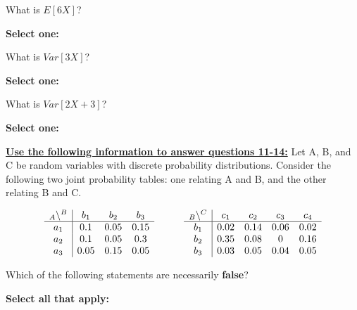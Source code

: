 \documentclass[11pt,addpoints,answers]{exam}
\numberwithin{equation}{section} %
\numberwithin{figure}{section} %
\numberwithin{table}{section} %
\begin{document}
\begin{questions}
    \question[1] What is $E[6X]$?

    \textbf{Select one:}
    \begin{checkboxes}
    \end{checkboxes}


    \question[1] What is $Var[3X]$?

    \textbf{Select one:}
    \begin{checkboxes}
    \end{checkboxes}


    \question[1] What is $Var[2X + 3]$?

    \textbf{Select one:}
    \begin{checkboxes}
    \end{checkboxes}

    \clearpage
    \textbf{\underline{Use the following information to answer questions 11-14:}}
    Let A, B, and C be random variables with discrete probability distributions. Consider the following two joint probability tables: one relating A and B, and the other relating B and C.
    
    $$\begin{array}{c|ccc}
    _{\large A}\backslash^{\large B} & b_1 & b_2 & b_3 \\
    \hline
    a_1 & 0.1 & 0.05 & 0.15 \\
    a_2 & 0.1 & 0.05 & 0.3 \\
    a_3 & 0.05 & 0.15 & 0.05 \\
    \end{array}
    \quad \quad \quad
    \begin{array}{c|cccc}
    _{\large B}\backslash^{\large C} & c_1 & c_2 & c_3 & c_4 \\
    \hline
    b_1 & 0.02 & 0.14 & 0.06 & 0.02 \\
    b_2 & 0.35 & 0.08 & 0 & 0.16 \\
    b_3 & 0.03 & 0.05 & 0.04 & 0.05 \\
    \end{array}$$

    \question[1] Which of the following statements are necessarily \textbf{false}?
    
    \textbf{Select all that apply:}
    \begin{checkboxes}{%
    \checkboxchar{$\Box$} \checkedchar{$\blacksquare$}

}
\end{checkboxes}
\end{questions}
\end{document}
